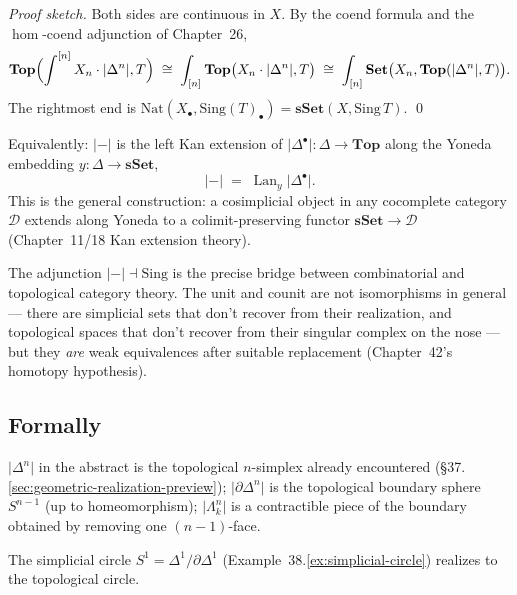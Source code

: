 \begin{proof}[Proof sketch]
Both sides are continuous in $X$. By the coend formula and the
$\hom$-coend adjunction of Chapter~26,
\begin{equation*}
  \mathbf{Top}\Bigl(\int^{[n]} X_n \cdot \lvert\Delta^n\rvert, T\Bigr)
  \;\cong\; \int_{[n]} \mathbf{Top}\bigl(X_n \cdot \lvert\Delta^n\rvert, T\bigr)
  \;\cong\; \int_{[n]} \mathbf{Set}\bigl(X_n, \mathbf{Top}(\lvert\Delta^n\rvert, T)\bigr).
\end{equation*}
The rightmost end is $\mathrm{Nat}(X_\bullet, \mathrm{Sing}(T)_\bullet) =
\mathbf{sSet}(X, \mathrm{Sing}\, T)$.
\qed
\end{proof}

\begin{remark}
\label{rem:realization-lkan}
Equivalently: $\lvert{-}\rvert$ is the left Kan extension of
$\lvert\Delta^\bullet\rvert : \Delta \to \mathbf{Top}$ along the Yoneda
embedding $y : \Delta \to \mathbf{sSet}$,
\begin{equation*}
  \lvert{-}\rvert \;=\; \operatorname{Lan}_y \lvert\Delta^\bullet\rvert.
\end{equation*}
This is the general construction: a cosimplicial object in any cocomplete
category $\mathcal{D}$ extends along Yoneda to a colimit-preserving
functor $\mathbf{sSet} \to \mathcal{D}$ (Chapter~11/18 Kan extension theory).
\end{remark}

\begin{readernote}
The adjunction $\lvert{-}\rvert \dashv \mathrm{Sing}$ is the precise
bridge between combinatorial and topological category theory. The
unit and counit are not isomorphisms in general — there are simplicial
sets that don't recover from their realization, and topological spaces
that don't recover from their singular complex on the nose — but they
\emph{are} weak equivalences after suitable replacement (Chapter~42's
homotopy hypothesis).
\end{readernote}

\subsection{Formally}

\begin{example_thm}
\label{ex:realization-low}
$\lvert\Delta^n\rvert$ in the abstract is the topological $n$-simplex
already encountered (\S37.\ref{sec:geometric-realization-preview});
$\lvert\partial\Delta^n\rvert$ is the topological boundary sphere $S^{n-1}$
(up to homeomorphism); $\lvert\Lambda^n_k\rvert$ is a contractible piece
of the boundary obtained by removing one $(n-1)$-face.

The simplicial circle $S^1 = \Delta^1/\partial\Delta^1$
(Example~38.\ref{ex:simplicial-circle}) realizes to the topological circle.
\end{example_thm}

